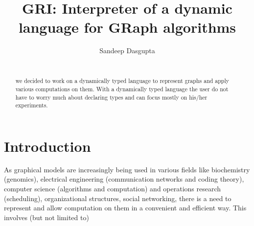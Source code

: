 \documentclass[letterpaper]{sig-alternate}
\begin{document}
\title{GRI: Interpreter of a dynamic language for GRaph algorithms}

%
\author{
\alignauthor Sandeep Dasgupta\\
       \\
}
\date{}

\maketitle
\begin{abstract}
we decided 
     to work on a dynamically typed language to represent graphs
     and apply various computations on them.
     With a dynamically typed language the user do not have to worry much about declaring types and can
     focus mostly on his/her experiments.

\end{abstract}


\section{Introduction}
As graphical models are increasingly being used in various
  fields like biochemistry (genomics), electrical engineering (communication
      networks and coding theory), computer science (algorithms and
        computation) and operations research (scheduling), organizational
      structures, social networking, there is a need to represent and allow
      computation on them in a convenient and efficient way. This involves (but not limited
          to)
\end{document}

